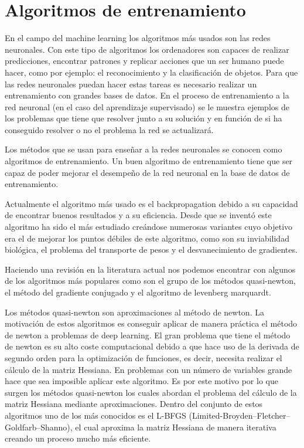 \chapter{Algoritmos de entrenamiento}

En el campo del machine learning los algoritmos más usados son las redes neuronales. Con este tipo de algoritmos los ordenadores son capaces de realizar predicciones, encontrar patrones y replicar acciones que un ser humano puede hacer, como por ejemplo: el reconocimiento y la clasificación de objetos. Para que las redes neuronales puedan hacer estas tareas es necesario realizar un entrenamiento con grandes bases de datos. En el proceso de entrenamiento a la red neuronal (en el caso del aprendizaje supervisado) se le muestra ejemplos de los problemas que tiene que resolver junto a su solución y en función de si ha conseguido resolver o no el problema la red se actualizará. 

Los métodos que se usan para enseñar a la redes neuronales se conocen como algoritmos de entrenamiento. Un buen algoritmo de entrenamiento tiene que ser capaz de poder mejorar el desempeño de la red neuronal en la base de datos de entrenamiento.

Actualmente el algoritmo más usado es el backpropagation \cite{RefWorks:RefID:6-rumelhart1986learning} debido a su capacidad de encontrar buenos resultados y a su eficiencia. Desde que se inventó este algoritmo ha sido el más estudiado creándose numerosas variantes cuyo objetivo era el de mejorar los puntos débiles de este algoritmo, como son su inviabilidad biológica, el problema del transporte de pesos \cite{RefWorks:RefID:10-grossberg1987competitive} y el desvanecimiento de gradientes.

Haciendo una revisión en la literatura actual nos podemos encontrar con algunos de los algoritmos más populares como son el grupo de los métodos quasi-newton, el método del gradiente conjugado y el algoritmo de levenberg marquardt.

Los métodos quasi-newton son aproximaciones al método de newton. La motivación de estos algoritmos es conseguir aplicar de manera práctica el método de newton a problemas de deep learning. El gran problema que tiene el método de newton es su alto coste computacional debido a que hace uso de la derivada de segundo orden para la optimización de funciones, es decir, necesita realizar el cálculo de la matriz Hessiana. En problemas con un número de variables grande hace que sea imposible aplicar este algoritmo. Es por este motivo por lo que surgen los métodos quasi-newton los cuales abordan el problema del cálculo de la matriz Hessiana mediante aproximaciones. Dentro del conjunto de estos algoritmos uno de los más conocidos es el L-BFGS \cite{RefWorks:RefID:12-rafati2018improving} (Limited-Broyden–Fletcher–Goldfarb–Shanno), el cual aproxima la matriz Hessiana de manera iterativa creando un proceso mucho más eficiente. 

